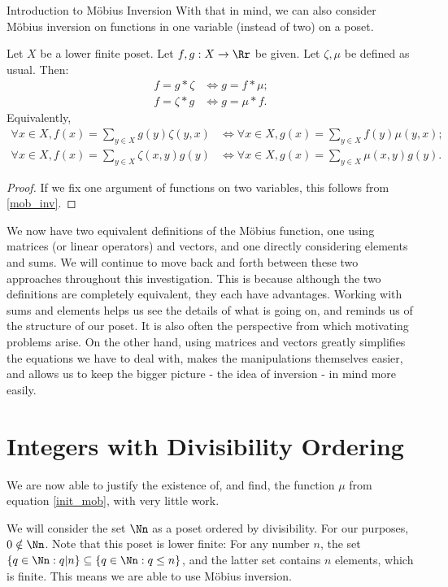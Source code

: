 \documentclass[12pt]{pom_thesis}
\begin{document}
\begin{chapter}{Introduction to M\"obius Inversion}
With that in mind, we can also consider M\"obius inversion on functions in one variable (instead of two) on a poset.
\begin{thm}\label{1var_mob_inv}
Let $X$ be a lower finite poset. Let $f,g:X \rightarrow \Rr$ be given. Let $\zeta, \mu$ be defined as usual. Then:
\begin{align*}
f = g *\zeta & \iff g = f *\mu;\\
f = \zeta *g & \iff g = \mu *f.
\end{align*}
Equivalently,
\begin{align*}
\forall x \in X, f(x) = \sum_{y \in X} g(y)\zeta(y,x) &\iff \forall x \in X, g(x) = \sum_{y \in X} f(y)\mu(y,x);\\
\forall x \in X, f(x) = \sum_{y \in X} \zeta(x,y)g(y) &\iff \forall x \in X, g(x) = \sum_{y \in X} \mu(x,y)g(y).
\end{align*}
\end{thm}
\begin{proof}
If we fix one argument of functions on two variables, this follows from \ref{mob_inv}.
\end{proof}
We now have two equivalent definitions of the M\"obius function, one using matrices (or linear operators) and vectors, and one directly considering elements and sums. We will continue to move back and forth between these two approaches throughout this investigation. This is because although the two definitions are completely equivalent, they each have advantages. Working with sums and elements helps us see the details of what is going on, and reminds us of the structure of our poset. It is also often the perspective from which motivating problems arise. On the other hand, using matrices and vectors greatly simplifies the equations we have to deal with, makes the manipulations themselves easier, and allows us to keep the bigger picture - the idea of inversion - in mind more easily. 

\section{Integers with Divisibility Ordering}
We are now able to justify the existence of, and find, the function $\mu$ from equation \ref{init_mob}, with very little work.

We will consider the set $\Nn$ as a poset ordered by divisibility. For our purposes, $0 \notin \Nn$. Note that this poset is lower finite: For any number $n$, the set $\{q \in \Nn: q|n\} \subseteq \{q \in \Nn: q \leq n\}$, and the latter set contains $n$ elements, which is finite. This means we are able to use M\"obius inversion.


\end{chapter}
\end{document}
